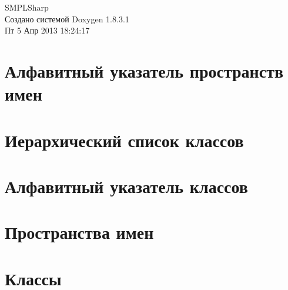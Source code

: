 \documentclass{book}
\begin{document}
\hypersetup{pageanchor=false,citecolor=blue}
\begin{titlepage}
\vspace*{7cm}
\begin{center}
{\Large S\-M\-P\-L\-Sharp }\\
\vspace*{1cm}
{\large Создано системой Doxygen 1.8.3.1}\\
\vspace*{0.5cm}
{\small Пт 5 Апр 2013 18:24:17}\\
\end{center}
\end{titlepage}
\clearemptydoublepage
{}
\tableofcontents
\clearemptydoublepage
{}
\hypersetup{pageanchor=true,citecolor=blue}
\chapter{Алфавитный указатель пространств имен}

\chapter{Иерархический список классов}

\chapter{Алфавитный указатель классов}

\chapter{Пространства имен}



\chapter{Классы}













\printindex
\end{document}
